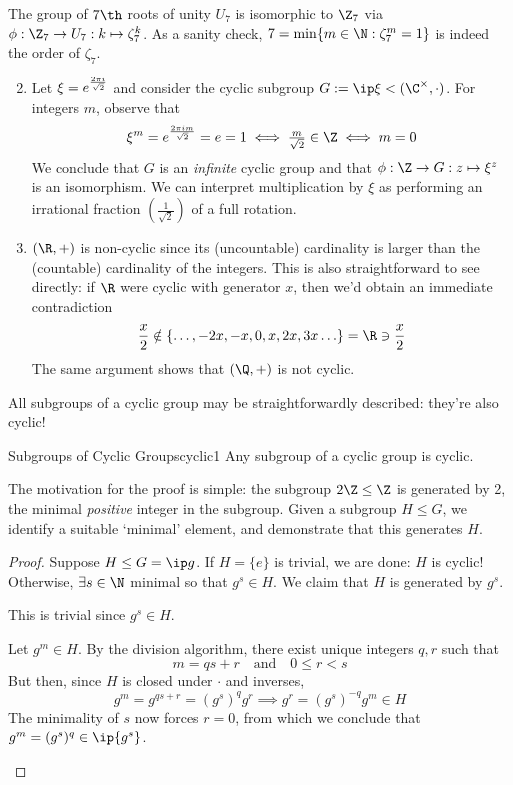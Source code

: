 \begin{examples}{}{}
	\exstart The group of $7\th$ roots of unity $U_7$ is isomorphic to $\Z_7$ via $\phi:\Z_7\to U_7:k\mapsto \zeta_7^k$. As a sanity check, $7=\min\{m\in\N:\zeta_7^m=1\}$ is indeed the order of $\zeta_7$.
	\begin{enumerate}\setcounter{enumi}{1}
		\item Let $\xi=\smash[t]{e^{\frac{2\pi i}{\sqrt 2}}}$ and consider the cyclic subgroup $G:=\ip\xi<(\C^\times,\cdot)$. For integers $m$, observe that
		\[
			\xi^m=e^{\frac{2\pi im}{\sqrt 2}}=e=1\iff \tfrac m{\sqrt 2}\in\Z\iff m=0
		\]
		We conclude that $G$ is an \emph{infinite} cyclic group and that $\phi:\Z\to G:z\mapsto\xi^z$ is an isomorphism. We can interpret multiplication by $\xi$ as performing an irrational fraction $(\frac 1{\sqrt 2})$ of a full rotation.
		
		\item $(\R,+)$ is non-cyclic since its (uncountable) cardinality is larger than the (countable) cardinality of the integers. This is also straightforward to see directly: if $\R$ were cyclic with generator $x$, then we'd obtain an immediate contradiction
		\[
			\frac x2\notin\{\ldots,-2x,-x,0,x,2x,3x\ldots\}=\R\ni\frac x2
		\]
		The same argument shows that $(\Q,+)$ is not cyclic.
	\end{enumerate}
\end{examples}

\bigskip


All subgroups of a cyclic group may be straightforwardly described: they're also cyclic!

\begin{thm}{Subgroups of Cyclic Groups}{cyclic1}
	Any subgroup of a cyclic group is cyclic.
\end{thm}

The motivation for the proof is simple: the subgroup $2\Z\le\Z$ is generated by 2, the minimal \emph{positive} integer in the subgroup. Given a subgroup $H\le G$, we identify a suitable `minimal' element, and demonstrate that this generates $H$.

\begin{proof}
	Suppose $H\le G=\ip g$. If $H=\{e\}$ is trivial, we are done: $H$ is cyclic!\smallbreak
	Otherwise, $\exists s\in\N$ minimal so that $g^s\in H$. We claim that $H$ is generated by $g^s$.
	\begin{description}\itemsep0pt
		\item[$\bigl(\ip{g^s}\subseteq H\bigr)$] This is trivial since $g^s\in H$.
		\item[$\bigl(H\subseteq \ip{g^s}\bigr)$] Let $g^m\in H$. By the division algorithm, there exist unique integers $q,r$ such that
		\[
			m=qs+r\quad\text{and}\quad 0\le r<s
		\]
		But then, since $H$ is closed under $\cdot$ and inverses,
		\[
			g^m=g^{qs+r}=(g^s)^qg^r\implies g^r=(g^s)^{-q}g^m\in H \tag{$\ast$}
		\]
		The minimality of $s$ now forces $r=0$, from which we conclude that $g^m=(g^s)^q\in\ip{g^s}$.\qedhere 
	\end{description}
\end{proof}

